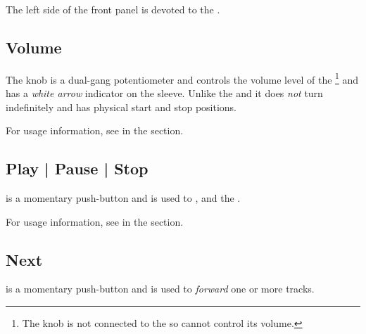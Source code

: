 The left side of the front panel is devoted to the \hyperref[Audio]{}.

\subsection{Volume} \label{Volume}

The  knob is a dual-gang potentiometer and controls the volume level of
the \footnote{ The  knob is not connected to the  so
cannot control its volume.} and has a \textit{white arrow} indicator on the
sleeve.  Unlike the \hyperref[Settings Knob]{} and
\hyperref[Brightness Knob]{} it does \textit{not} turn indefinitely and
has physical start and stop positions.

\par\medskip

For usage information, see \hyperref[Audio - Volume]{} in the
\hyperref[Audio]{} section.

\subsection{Play | Pause | Stop} \label{Play|Pause|Stop}

 is a momentary push-button and is used to ,  and
 the .

\par\medskip

For usage information, see \hyperref[Audio - Play|Pause|Stop]{} in the
\hyperref[Audio]{} section.

\subsection{Next} \label{Next}

 is a momentary push-button and is used to  \textit{forward} one
or more tracks.

